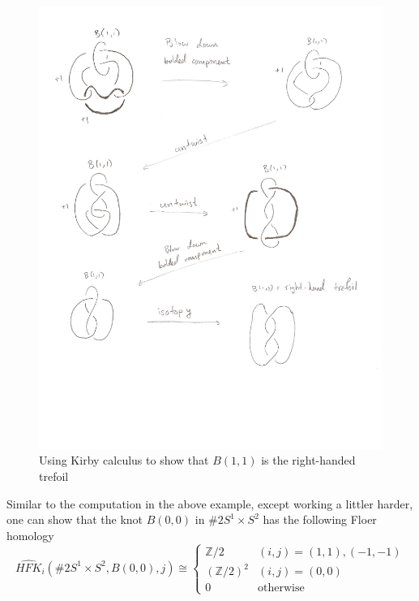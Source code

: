 \begin{example}
\begin{figure}[p]
\centering
\includegraphics[scale=1]{graphics/borromean-knot-trefoil}
\caption{Using Kirby calculus to show that $B(1,1)$ is the right-handed trefoil}
\label{borromean-knot-trefoil}
\end{figure}

\end{example}

\begin{example}
Similar to the computation in the above example, except working a littler harder, one can show that the knot $B(0,0)$ in $\#2 S^1 \times S^2$ has the following Floer homology
\[ \widehat{HFK}_i(\#2 S^1 \times S^2,B(0,0),j) \cong \begin{cases} \mathbb Z/2 & (i,j)=(1,1),(-1,-1) \\ (\mathbb Z/2)^2 & (i,j)=(0,0) \\ 0 & \text{otherwise} \end{cases} \]
\end{example}


